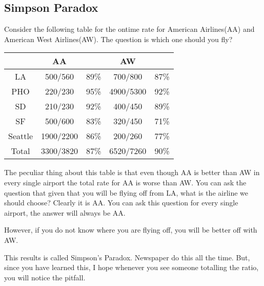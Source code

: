 \documentclass[a4paper, 12pt]{article}
\begin{document}
\begin{multicols}{2}
\section*{Simpson Paradox}
Consider the following table for the ontime rate for American Airlines(AA) and American West Airlines(AW). The question is which one should you fly?

\begin{center}
	\begin{tabular}{|c|c|c|c|c|}
	\hline  & AA &  & AW &  \\ 
	\hline LA & 500/560 & 89\% & 700/800 & 87\% \\ 
	\hline PHO & 220/230 & 95\% & 4900/5300 & 92\% \\ 
	\hline SD & 210/230 & 92\% & 400/450 & 89\% \\ 
	\hline SF & 500/600 & 83\% & 320/450 & 71\% \\ 
	\hline Seattle & 1900/2200 & 86\% & 200/260 & 77\% \\ 
	\hline\hline Total & 3300/3820 & 87\% & 6520/7260 & 90\% \\ 
	\hline 
\end{tabular} 
\end{center}

The peculiar thing about this table is that even though AA is better than AW in every single airport the total rate for AA is worse than AW. You can ask the question that given that you will be flying off from LA, what is the airline we should choose? Clearly it is AA. You can ask this question for every single airport, the answer will always be AA.

However, if you do not know where you are flying off, you will be better off with AW.

This results is called Simpson's Paradox. Newspaper do this all the time. But, since you have learned this, I hope whenever you see someone totalling the ratio, you will notice the pitfall.





\end{multicols}
\end{document}
